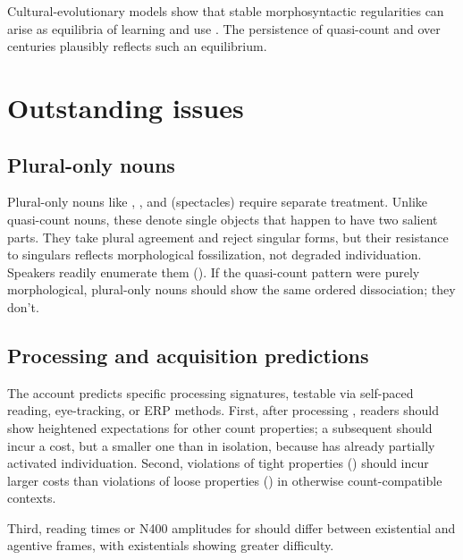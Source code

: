 \documentclass[12pt,a4paper]{article}
\begin{document}
Cultural-evolutionary models show that stable morphosyntactic regularities can arise as equilibria of learning and use \citep{kirby2008}. The persistence of quasi-count  and  over centuries plausibly reflects such an equilibrium.

\section{Outstanding issues}\label{sec:outstanding}

\subsection{Plural-only nouns}

Plural-only nouns like , , and  (spectacles) require separate treatment. Unlike quasi-count nouns, these denote single objects that happen to have two salient parts. They take plural agreement and reject singular forms, but their resistance to singulars reflects morphological fossilization, not degraded individuation. Speakers readily enumerate them (). If the quasi-count pattern were purely morphological, plural-only nouns should show the same ordered dissociation; they don't.

\subsection{Processing and acquisition predictions}

The account predicts specific processing signatures, testable via self-paced reading, eye-tracking, or ERP methods. First, after processing , readers should show heightened expectations for other count properties; a subsequent  should incur a cost, but a smaller one than  in isolation, because  has already partially activated individuation. Second, violations of tight properties () should incur larger costs than violations of loose properties () in otherwise count-compatible contexts.

Third, reading times or N400 amplitudes for  should differ between existential and agentive frames, with existentials showing greater difficulty.
\end{document}
